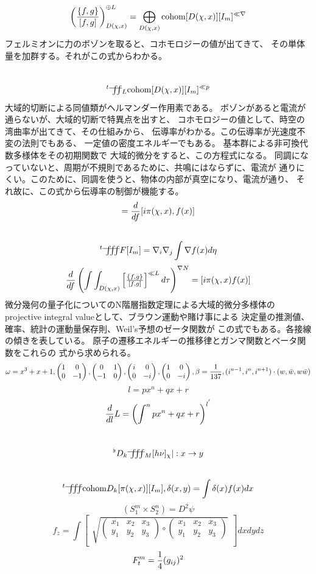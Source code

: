 \documentclass{jsarticle}
\begin{document}
   $$ \left({{\{f,g\}} \over {[f,g]}}\right)^{\oplus L}_{D(\chi,x)}
   = \bigoplus_{D(\chi,x)}\mathrm{cohom}[D(\chi,x)][I_m]^{\ll \nabla} $$
   フェルミオンに力のボゾンを取ると、コホモロジーの値が出てきて、
   その単体量を加群する。それがこの式からわかる。
   $$ {}^t \variint_L \mathrm{cohom}[D(\chi,x)][I_m]^{\ll p} $$
   大域的切断による同値類がヘルマンダー作用素である。
   ボゾンがあると電流が通らないが、大域的切断で特異点を出すと、
   コホモロジーの値として、時空の湾曲率が出てきて、その仕組みから、
   伝導率がわかる。この伝導率が光速度不変の法則でもある、
   一定値の密度エネルギーでもある。
   基本群による非可換代数多様体をその初期関数で
   大域的微分をすると、この方程式になる。
   同調になっていないと、周期が不規則であるために、共鳴にはならずに、電流が
   通りにくい。このために、同調を使うと、物体の内部が真空になり、電流が通り、
   それ故に、この式から伝導率の制御が機能する。
   $$ = {d \over df}[i \pi(\chi,x),f(x)] $$
   $$ {}^t \variiint F[I_m] = \nabla_i \nabla_j \int \nabla f(x)d \eta $$
   $$ {d \over df}\left(\int \int_{D(\chi,x)} \begin{bmatrix}{ {\{f,g\}}
   \over [f,g]} \end{bmatrix}^{\ll L}d \tau \right)^{\nabla N} 
   = [i \pi(\chi,x) f(x)] $$
   微分幾何の量子化についてのN階層指数定理による大域的微分多様体の
   projective integral valueとして、ブラウン運動や賭け事による
   決定量の推測値、確率、統計の運動量保存則、Weil's予想のゼータ関数が
   この式でもある。各接線の傾きを表している。
   原子の遷移エネルギーの推移律とガンマ関数とベータ関数をこれらの
   式から求められる。
   $$ \omega = x^3 + x + 1, \begin{pmatrix}1 & 0 \\
   0 & - 1 \end{pmatrix}, \begin{pmatrix} 0 & 1 \\
   - 1 & 0 \end{pmatrix}, \begin{pmatrix} i & 0 \\
   0 & - i \end{pmatrix}, \begin{pmatrix} 1 & 0 \\
   0 & - i \end{pmatrix}, \beta = {1 \over 137}, (i^{n - 1}, i^{n},
   i^{n + 1})\cdot (w,\bar{w},w \bar{w}) $$
   $$ l = px^n + qx + r $$
   $$ {d \over dl}L = \left(\int^n px^n + qx + r \right)^{{l}^{{'}}} $$
   $$ {}^\flat D_k \variiint_M[ h \nu]_{\chi} |: x \to y $$
   $$ {}^t \variiint \mathrm{cohom}D_k[\pi(\chi,x)][I_m], \delta(x,y)
   = \int \delta(x)f(x)dx $$
   $$ (S^m_1 \times S^n_2) = D^2 \psi $$
   $$ f_{z} = \int \begin{bmatrix} 
	   \sqrt{\begin{pmatrix} x_{1} & x_{2} & x_{3} \\
  y_{1} & y_{2} & y_{3} \end{pmatrix}
     \circ
   \begin{pmatrix} x_{1} & x_{2} & x_{3} \\
  y_{1} & y_{2} & y_{3} \end{pmatrix}}_{}
     \end{bmatrix}dxdydz $$
 $$ F^m_{t} = {1 \over 4}(g_{ij})^2 $$
\end{document}
